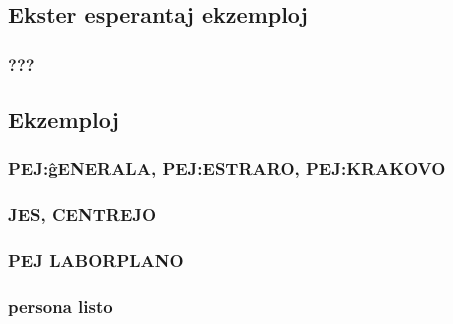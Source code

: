 \documentclass{beamer}
\begin{document}
\subsection{Ekster esperantaj ekzemploj}

  \begin{frame}
    \frametitle{???}

  \end{frame}

\subsection{Ekzemploj}

  \begin{frame}
    \frametitle{PEJ:ĝENERALA, PEJ:ESTRARO, PEJ:KRAKOVO}

  \end{frame}


  \begin{frame}
    \frametitle{JES, CENTREJO}

  \end{frame}


  \begin{frame}
    \frametitle{PEJ LABORPLANO}

  \end{frame}


  \begin{frame}
    \frametitle{persona listo}

  \end{frame}

  
\end{document}
